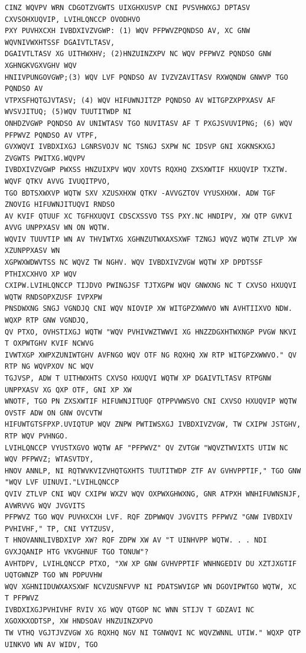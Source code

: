 \documentclass[12pt,a4paper]{article}
\begin{document}
\begin{lstlisting}[caption={Intercepted Ciphertext (Variant 19)}]
CINZ WQVPV WRN CDGOTZVGWTS UIXGHXUSVP CNI PVSVHWXGJ DPTASV CXVSOHXUQVIP, LVIHLQNCCP OVODHVO 
PXY PUVHXCXH IVBDXIVZVGWP: (1) WQV PFPWVZPQNDSO AV, XC GNW WQVNIVWXHTSSF DGAIVTLTASV, 
DGAIVTLTASV XG UITHWXHV; (2)HNZUINZXPV NC WQV PFPWVZ PQNDSO GNW XGHNGKVGXVGHV WQV 
HNIIVPUNGOVGWP;(3) WQV LVF PQNDSO AV IVZVZAVITASV RXWQNDW GNWVP TGO PQNDSO AV 
VTPXSFHQTGJVTASV; (4) WQV HIFUWNJITZP PQNDSO AV WITGPZXPPXASV AF WVSVJITUQ; (5)WQV TUUTITWDP NI 
ONHDZVGWP PQNDSO AV UNIWTASV TGO NUVITASV AF T PXGJSVUVIPNG; (6) WQV PFPWVZ PQNDSO AV VTPF, 
GVXWQVI IVBDXIXGJ LGNRSVOJV NC TSNGJ SXPW NC IDSVP GNI XGKNSKXGJ ZVGWTS PWITXG.WQVPV 
IVBDXIVZVGWP PWXSS HNZUIXPV WQV XOVTS RQXHQ ZXSXWTIF HXUQVIP TXZTW. WQVF QTKV AVVG IVUQITPVO, 
TGO BDTSXWXVP WQTW SXV XZUSXHXW QTKV -AVVGZTOV VYUSXHXW. ADW TGF ZNOVIG HIFUWNJITUQVI RNDSO 
AV KVIF QTUUF XC TGFHXUQVI CDSCXSSVO TSS PXY.NC HNDIPV, XW QTP GVKVI AVVG UNPPXASV WN ON WQTW. 
WQVIV TUUVTIP WN AV THVIWTXG XGHNZUTWXAXSXWF TZNGJ WQVZ WQTW ZTLVP XW XZUNPPXASV WN 
XGPWXWDWVTSS NC WQVZ TW NGHV. WQV IVBDXIVZVGW WQTW XP DPDTSSF PTHIXCXHVO XP WQV 
CXIPW.LVIHLQNCCP TIJDVO PWINGJSF TJTXGPW WQV GNWXNG NC T CXVSO HXUQVI WQTW RNDSOPXZUSF IVPXPW 
PNSDWXNG SNGJ VGNDJQ CNI WQV NIOVIP XW WITGPZXWWVO WN AVHTIIXVO NDW. WQXP RTP GNW VGNDJQ, 
QV PTXO, OVHSTIXGJ WQTW "WQV PVHIVWZTWWVI XG HNZZDGXHTWXNGP PVGW NKVI T OXPWTGHV KVIF NCWVG 
IVWTXGP XWPXZUNIWTGHV AVFNGO WQV OTF NG RQXHQ XW RTP WITGPZXWWVO." QV RTP NG WQVPXOV NC WQV 
TGJVSP, ADW T UITHWXHTS CXVSO HXUQVI WQTW XP DGAIVTLTASV RTPGNW UNPPXASV XG QXP OTF, GNI XP XW 
WNOTF, TGO PN ZXSXWTIF HIFUWNJITUQF QTPPVWWSVO CNI CXVSO HXUQVIP WQTW OVSTF ADW ON GNW OVCVTW 
HIFUWTGTSFPXP.UVIQTUP WQV ZNPW PWTIWSXGJ IVBDXIVZVGW, TW CXIPW JSTGHV, RTP WQV PVHNGO. 
LVIHLQNCCP VYUSTXGVO WQTW AF "PFPWVZ" QV ZVTGW "WQVZTWVIXTS UTIW NC WQV PFPWVZ; WTASVTDY, 
HNOV ANNLP, NI RQTWVKVIZVHQTGXHTS TUUTITWDP ZTF AV GVHVPPTIF," TGO GNW "WQV LVF UINUVI."LVIHLQNCCP 
QVIV ZTLVP CNI WQV CXIPW WXZV WQV OXPWXGHWXNG, GNR ATPXH WNHIFUWNSNJF, AVWRVVG WQV JVGVITS 
PFPWVZ TGO WQV PUVHXCXH LVF. RQF ZDPWWQV JVGVITS PFPWVZ "GNW IVBDXIV PVHIVHF," TP, CNI VYTZUSV, 
T HNOVANNLIVBDXIVP XW? RQF ZDPW XW AV "T UINHVPP WQTW. . . NDI GVXJQANIP HTG VKVGHNUF TGO TONUW"? 
AVHTDPV, LVIHLQNCCP PTXO, "XW XP GNW GVHVPPTIF WNHNGEDIV DU XZTJXGTIF UQTGWNZP TGO WN PDPUVHW 
WQV XGHNIIDUWXAXSXWF NCVZUSNFVVP NI PDATSWVIGP WN DGOVIPWTGO WQTW, XC T PFPWVZ 
IVBDXIXGJPVHIVHF RVIV XG WQV QTGOP NC WNN STIJV T GDZAVI NC XGOXKXODTSP, XW HNDSOAV HNZUINZXPVO 
TW VTHQ VGJTJVZVGW XG RQXHQ NGV NI TGNWQVI NC WQVZWNNL UTIW." WQXP QTP UINKVO WN AV WIDV, TGO 

\end{lstlisting}
\end{document}
